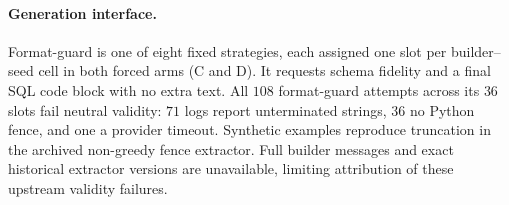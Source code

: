 \paragraph{Generation interface.}\label{app:extraction}
Format-guard is one of eight fixed strategies, each assigned one slot
per builder--seed cell in both forced arms (C and D). It requests schema
fidelity and a final SQL code block with no extra text.
All $108$ format-guard attempts across its $36$ slots fail
neutral validity: $71$ logs report unterminated strings, $36$ no Python
fence, and one a provider timeout. Synthetic examples reproduce
truncation in the archived non-greedy fence extractor. Full builder
messages and exact historical extractor versions are unavailable,
limiting attribution of these upstream validity failures.

